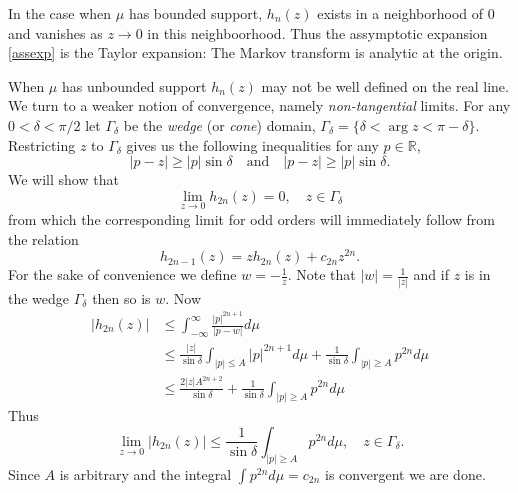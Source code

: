 \documentclass{amsart}
\theoremstyle{remark}
\numberwithin{equation}{section}
\newcommand{\RR}{\mathbb{R}}
\begin{document}
In the case when $\mu$ has bounded support, $h_n(z)$ exists in a neighborhood of $0$ and vanishes as $z \rightarrow 0$ in this neighboorhood. Thus the assymptotic expansion \ref{assexp} is the Taylor expansion: The Markov transform is analytic at the origin.

\begin{figure}
\end{figure}

When $\mu$ has unbounded support $h_n(z)$ may not be well defined on the real line. We turn to a weaker notion of convergence, namely \textit{non-tangential} limits. For any $0 < \delta < \pi/2$ let $\Gamma_\delta$ be the \textit{wedge} (or \textit{cone}) domain, $\Gamma_\delta = \{\delta < \arg z < \pi - \delta\}$.
Restricting $z$ to $\Gamma_\delta$ gives us the following inequalities for any $p \in \RR$,
\[
    |p - z| \geq |p| \sin \delta 
    \quad\text{and} \quad
    |p - z| \geq |p| \sin \delta.
\]
We will show that
\[
    \lim_{z \rightarrow 0} h_{2n}(z) = 0, \quad z \in \Gamma_\delta
\]
from which the corresponding limit for odd orders will immediately follow from the relation
\[
    h_{2n-1}(z)
    = zh_{2n}(z) + c_{2n}z^{2n}.
\] 
For the sake of convenience we define $w = -\frac1z$. Note that $|w| = \frac1{|z|}$ and if $z$ is in the wedge $\Gamma_\delta$ then so is $w$. Now 
\begin{align*}
    |h_{2n}(z)| 
    &\leq \int_{-\infty}^\infty \frac{|p|^{2n+1}}{|p - w|}d\mu \\
    &\leq \frac{|z|}{\sin \delta} \int_{|p| \leq A} |p|^{2n+1} d\mu
    + \frac1{\sin \delta} \int_{|p| \geq A} p^{2n} d\mu \\
    &\leq \frac{2|z| A^{2n+2}}{\sin \delta}
    + \frac1{\sin \delta} \int_{|p| \geq A} p^{2n} d\mu
\end{align*}
Thus 
\[
    \lim_{z \rightarrow 0} |h_{2n}(z)| \leq \frac1{\sin \delta} \int_{|p| \geq A} p^{2n} d\mu, \quad z \in \Gamma_\delta.
\]
Since $A$ is arbitrary and the integral $\int p^{2n} d\mu = c_{2n}$ is convergent we are done.
\end{document}
